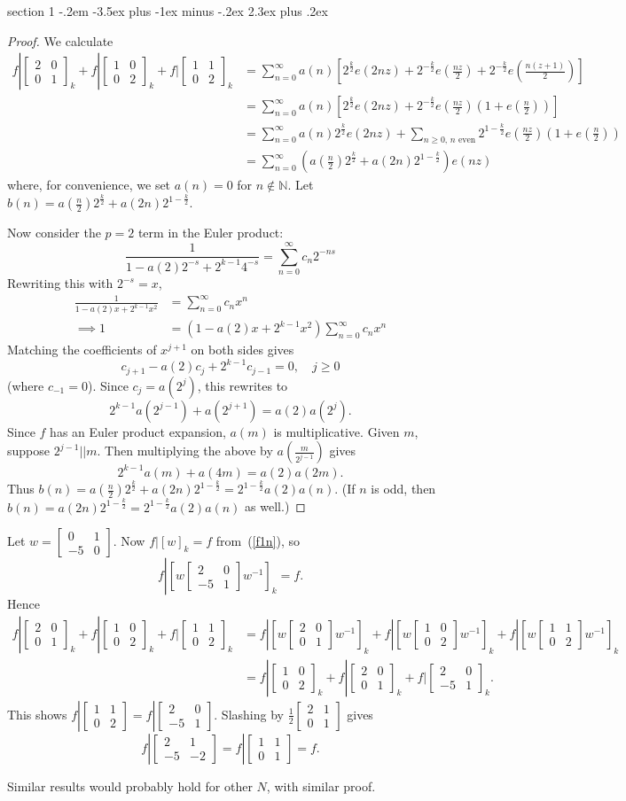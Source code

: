 \documentclass[12pt]{article}
\makeatletter
\theoremstyle{norm}
\newcommand{\N}[0]{\mathbb{N}}
\newcommand{\nin}[0]{\not\in}
\newcommand{\rc}[1]{\frac{1}{#1}}
\newcommand{\ba}[1]{\left[ {#1} \right]}
\newcommand{\pa}[1]{\left( {#1} \right)}
\newcommand{\pf}[2]{\pa{\frac{#1}{#2}}}
\newcommand{\matt}[4]{
\left[
\begin{matrix}
{#1}&{#2}\\
{#3}&{#4}
\end{matrix}
\right]}
\newcommand{\smatt}[4]{
\left[
\begin{smallmatrix}
{#1}&{#2}\\
{#3}&{#4}
\end{smallmatrix}
\right]}
\newcommand{\iy}[0]{\infty}
\newenvironment{problem}{\@startsection
       {section}
       {1}
       {-.2em}
       {-3.5ex plus -1ex minus -.2ex}
       {2.3ex plus .2ex}
       {\pagebreak[3]%
       \large\bf\noindent{Problem }
       }
       }
       {%
       }
\makeatother
\begin{document}
\begin{problem}{\it }
\begin{proof}
We calculate
\begin{align*}
f|\matt 2001_k+f|\matt1002_k+f|\matt1102_k
&=\sum_{n=0}^{\iy} a(n)\ba{
2^{\frac k2}e(2nz)+2^{-\frac k2}e\pf{nz}{2} +2^{-\frac k2} e\pf{n(z+1)}{2}
}\\
&=\sum_{n=0}^{\iy} a(n)\ba{
2^{\frac k2}e(2nz)+2^{-\frac k2}e\pf{nz}{2}\pa{1+e\pf n2}
}\\
&=\sum_{n=0}^{\iy} a(n)
2^{\frac k2}e(2nz)+\sum_{n\ge 0,\,n\text{ even}}2^{1-\frac k2}e\pf{nz}{2}\pa{1+e\pf n2}\\
&=\sum_{n=0}^{\iy}\pa{a\pf n2 2^{\frac k2}+a(2n)2^{1-\frac k2}}e(nz)
\end{align*}
where, for convenience, we set $a(n)=0$ for $n\nin \N$. Let $b(n)=a\pf n2 2^{\frac k2}+a(2n)2^{1-\frac k2}$.

Now consider the $p=2$ term in the Euler product:
\[
\rc{1-a(2)2^{-s}+2^{k-1}4^{-s}}=\sum_{n=0}^{\infty}c_n2^{-ns}
\]
Rewriting this with $2^{-s}=x$,
\begin{align*}
\rc{1-a(2)x+2^{k-1}x^2}&=\sum_{n=0}^{\infty}c_nx^n\\
\implies 1&=(1-a(2)x+2^{k-1}x^2)\sum_{n=0}^{\infty}c_nx^n
\end{align*}
Matching the coefficients of $x^{j+1}$ on both sides gives
\[
c_{j+1}-a(2)c_{j}+2^{k-1}c_{j-1}=0,\quad j\ge0
\]
(where $c_{-1}=0$).
Since $c_j=a(2^j)$, this rewrites to
\[
2^{k-1}a(2^{j-1})+a(2^{j+1})=a(2)a(2^j).
\]
Since $f$ has an Euler product expansion, $a(m)$ is multiplicative. Given $m$, suppose $2^{j-1}||m$. Then multiplying the above by $a\pf m{2^{j-1}}$ gives
\[
2^{k-1}a(m)+a(4m)=a(2)a(2m).
\]
Thus $b(n)=a\pf n2 2^{\frac k2}+a(2n)2^{1-\frac k2}=2^{1-\frac k2} a(2)a(n)$. (If $n$ is odd, then $b(n)=a(2n)2^{1-\frac k2}=2^{1-\frac k2}a(2)a(n)$ as well.)
\end{proof}
\end{problem}
Let $w=\smatt 01{-5}0$. 
Now $f|[w]_k=f$ from~(\ref{f1n}), so
\[
f\left|\ba{w\matt 20{-5}1w^{-1}}_k\right.=f.
\]
Hence
\begin{align*}
f|\matt 2001_k+f|\matt1002_k+f|\matt1102_k
&=f\left|\ba{w\matt 2001w^{-1}}\right._k+f\left|\ba{w\matt1002w^{-1}}\right._k+f\left|\ba{w\matt1102w^{-1}}\right._k\\
&=f|\matt1002_k+f|\matt 2001_k+f|\matt20{-5}1_k.
\end{align*}
This shows $f|\smatt1102=f|\smatt 20{-5}1$. Slashing by $\rc 2 \smatt2101$ gives
\[
f|\matt 21{-5}{-2}=f|\matt1101=f.
\]

Similar results would probably hold for other $N$, with similar proof. 
\end{document}
